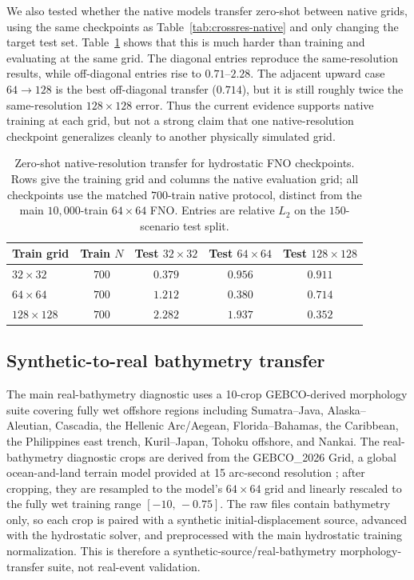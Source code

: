 We also tested whether the native models transfer zero-shot between native grids, using the same checkpoints as Table~\ref{tab:crossres-native} and only changing the target test set. Table~\ref{tab:crossres-native-transfer} shows that this is much harder than training and evaluating at the same grid. The diagonal entries reproduce the same-resolution results, while off-diagonal entries rise to $0.71$--$2.28$. The adjacent upward case $64 \rightarrow 128$ is the best off-diagonal transfer ($0.714$), but it is still roughly twice the same-resolution $128 \times 128$ error. Thus the current evidence supports native training at each grid, but not a strong claim that one native-resolution checkpoint generalizes cleanly to another physically simulated grid.

\begin{table}[H]
\centering
\caption{Zero-shot native-resolution transfer for hydrostatic FNO checkpoints. Rows give the training grid and columns the native evaluation grid; all checkpoints use the matched $700$-train native protocol, distinct from the main $10{,}000$-train $64 \times 64$ FNO. Entries are relative $L_2$ on the $150$-scenario test split.}
\label{tab:crossres-native-transfer}
\begin{tabular}{lcccc}
    \toprule
    Train grid & Train $N$ & Test $32 \times 32$ & Test $64 \times 64$ & Test $128 \times 128$ \\
    \midrule
    $32 \times 32$   & $700$ & $0.379$ & $0.956$ & $0.911$ \\
    $64 \times 64$   & $700$ & $1.212$ & $0.380$ & $0.714$ \\
    $128 \times 128$ & $700$ & $2.282$ & $1.937$ & $0.352$ \\
    \bottomrule
\end{tabular}
\end{table}

\subsection{Synthetic-to-real bathymetry transfer}
\label{subsec:res-real}

The main real-bathymetry diagnostic uses a 10-crop GEBCO-derived morphology suite covering fully wet offshore regions including Sumatra--Java, Alaska--Aleutian, Cascadia, the Hellenic Arc/Aegean, Florida--Bahamas, the Caribbean, the Philippines east trench, Kuril--Japan, Tohoku offshore, and Nankai. The real-bathymetry diagnostic crops are derived from the GEBCO\_2026 Grid, a global ocean-and-land terrain model provided at 15 arc-second resolution \citep{gebco2026}; after cropping, they are resampled to the model's $64 \times 64$ grid and linearly rescaled to the fully wet training range $[-10,\, -0.75]$. The raw files contain bathymetry only, so each crop is paired with a synthetic initial-displacement source, advanced with the hydrostatic solver, and preprocessed with the main hydrostatic training normalization. This is therefore a synthetic-source/real-bathymetry morphology-transfer suite, not real-event validation.


